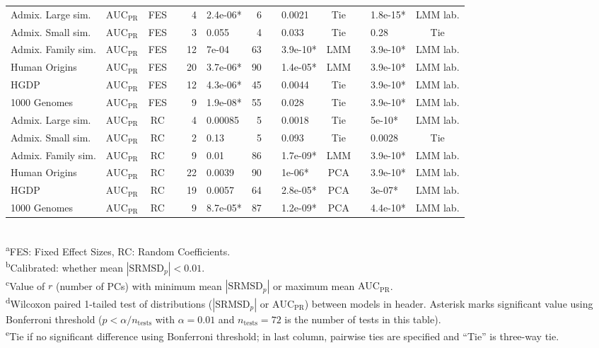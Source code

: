 \documentclass[9pt,lineno]{elife}
\newcommand{\rmsd}{\text{SRMSD}_p}
\newcommand{\auc}{\text{AUC}_\text{PR}}
\begin{document}
\begin{table}[bt]
\begin{fullwidth}
\begin{tabular}{lcc|crl|rclc|clc}
      Admix. Large sim.	&$\auc$	&FES	&	&4	&2.4e-06*	&6	&	&0.0021	&Tie	&	&1.8e-15*	&LMM lab. \\
      Admix. Small sim.	&$\auc$	&FES	&	&3	&0.055	&4	&	&0.033	&Tie	&	&0.28	&Tie \\
      Admix. Family sim.	&$\auc$	&FES	&	&12	&7e-04	&63	&	&3.9e-10*	&LMM	&	&3.9e-10*	&LMM lab. \\
      Human Origins	&$\auc$	&FES	&	&20	&3.7e-06*	&90	&	&1.4e-05*	&LMM	&	&3.9e-10*	&LMM lab. \\
      HGDP	&$\auc$	&FES	&	&12	&4.3e-06*	&45	&	&0.0044	&Tie	&	&3.9e-10*	&LMM lab. \\
      1000 Genomes	&$\auc$	&FES	&	&9	&1.9e-08*	&55	&	&0.028	&Tie	&	&3.9e-10*	&LMM lab. \\
      Admix. Large sim.	&$\auc$	&RC	&	&4	&0.00085	&5	&	&0.0018	&Tie	&	&5e-10*	&LMM lab. \\
      Admix. Small sim.	&$\auc$	&RC	&	&2	&0.13	&5	&	&0.093	&Tie	&	&0.0028	&Tie \\
      Admix. Family sim.	&$\auc$	&RC	&	&9	&0.01	&86	&	&1.7e-09*	&LMM	&	&3.9e-10*	&LMM lab. \\
      Human Origins	&$\auc$	&RC	&	&22	&0.0039	&90	&	&1e-06*	&PCA	&	&3.9e-10*	&LMM lab. \\
      HGDP	&$\auc$	&RC	&	&19	&0.0057	&64	&	&2.8e-05*	&PCA	&	&3e-07*	&LMM lab. \\
      1000 Genomes	&$\auc$	&RC	&	&9	&8.7e-05*	&87	&	&1.2e-09*	&PCA	&	&4.4e-10*	&LMM lab. \\
      \bottomrule
    \end{tabular}
    \\
    \textsuperscript{a}FES: Fixed Effect Sizes, RC: Random Coefficients.\\
    \textsuperscript{b}Calibrated: whether mean $|\rmsd| < 0.01$.\\
    \textsuperscript{c}Value of $r$ (number of PCs) with minimum mean $|\rmsd|$ or maximum mean $\auc$.\\
    \textsuperscript{d}Wilcoxon paired 1-tailed test of distributions ($|\rmsd|$ or $\auc$) between models in header.
    Asterisk marks significant value using Bonferroni threshold ($p < \alpha/n_\text{tests}$ with $\alpha = 0.01$ and $n_\text{tests} = 72$ is the number of tests in this table).\\
    \textsuperscript{e}Tie if no significant difference using Bonferroni threshold; in last column, pairwise ties are specified and ``Tie'' is three-way tie.
  \end{fullwidth}
\end{table}
\end{document}
